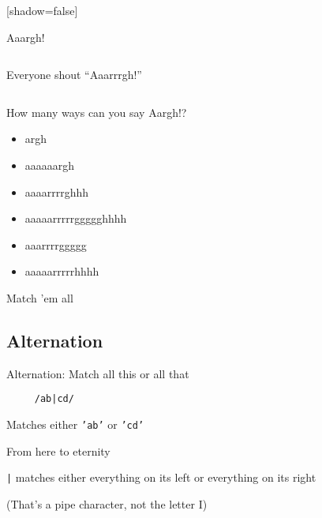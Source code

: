 \documentclass{beamer}
\begin{document}
[shadow=false]
\begin{frame}{Aaargh!}
  \begin{columns}[c]
      \begin{block}{}
      Everyone shout ``Aaarrrgh!''
      \end{block}
  \end{columns}
\end{frame}

\begin{frame}{How many ways can you say Aargh!?}
  \begin{itemize}
  \item argh
  \item aaaaaargh
  \item aaaarrrrghhh
  \item aaaaarrrrrggggghhhh
  \item aaarrrrggggg
  \item aaaaarrrrrhhhh
  \end{itemize}
\end{frame}

\begin{frame}[fragile]{Match 'em all}
  \begin{semiverbatim}
  \end{semiverbatim}
\end{frame}

\subsection{Alternation}

\begin{frame}[fragile]{Alternation: Match all this or all that}
  \begin{verbatim}
     /ab|cd/
  \end{verbatim}
  Matches either \texttt{'ab'} or \texttt{'cd'}
\end{frame}

\begin{frame}[t]{From here to eternity}
  \begin{block}{}
  \begin{center}
  \texttt{|} matches either everything on its left or everything on its right

  (That's a pipe character, not the letter I)
  \end{center}
  \end{block}
  \begin{center}
  \end{center}
\end{frame}
\end{document}
